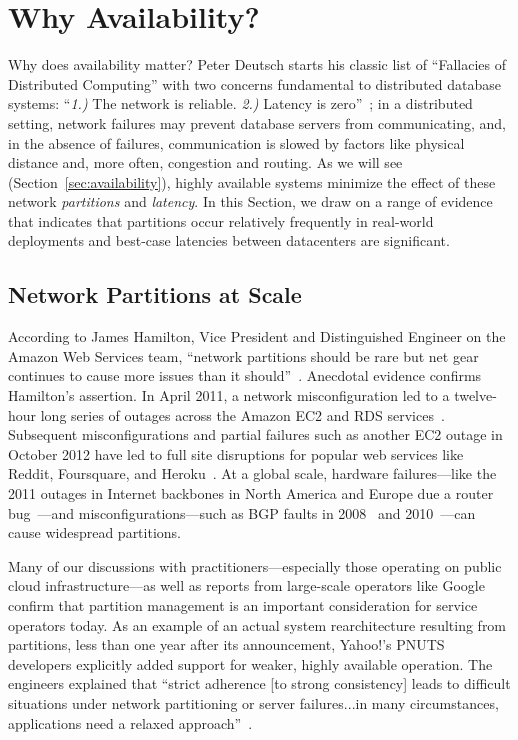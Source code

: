 
\section{Why Availability?}
\label{sec:motivation}

Why does availability matter? Peter Deutsch starts his classic list of
``Fallacies of Distributed Computing'' with two concerns fundamental
to distributed database systems: ``\textit{1.)}  The network is
reliable. \textit{2.)} Latency is zero''~\cite{fallacies-deutsch}; in
a distributed setting, network failures may prevent database servers
from communicating, and, in the absence of failures, communication is
slowed by factors like physical distance and, more often, congestion
and routing. As we will see (Section~\ref{sec:availability}), highly
available systems minimize the effect of these network
\textit{partitions} and \textit{latency}. In this Section, we draw on
a range of evidence that indicates that partitions occur relatively
frequently in real-world deployments and best-case latencies between
datacenters are significant.

\subsection{Network Partitions at Scale}

According to James Hamilton, Vice President and Distinguished Engineer
on the Amazon Web Services team, ``network partitions should be rare
but net gear continues to cause more issues than it
should''~\cite{hamilton-partitions}. Anecdotal evidence confirms
Hamilton's assertion. In April 2011, a network misconfiguration led to
a twelve-hour long series of outages across the Amazon EC2 and RDS
services~\cite{amazon-netpartition}. Subsequent misconfigurations and
partial failures such as another EC2 outage in October 2012 have led
to full site disruptions for popular web services like Reddit,
Foursquare, and Heroku~\cite{ec2-downsites}. At a global scale,
hardware failures---like the 2011 outages in Internet backbones in
North America and Europe due a router
bug~\cite{juniper-partition}---and misconfigurations---such as BGP
faults in 2008~\cite{pakistan-youtube} and
2010~\cite{research-experiment-partition}---can cause widespread
partitions.

Many of our discussions with practitioners---especially those
operating on public cloud infrastructure---as well as reports from
large-scale operators like Google~\cite{dean-keynote} confirm that
partition management is an important consideration for service operators
today. As an example of an actual system rearchitecture resulting from
partitions, less than one year after its announcement, Yahoo!'s PNUTS
developers explicitly added support for weaker, highly available
operation. The engineers explained that ``strict adherence [to strong
  consistency] leads to difficult situations under network
partitioning or server failures...in many circumstances, applications
need a relaxed approach''~\cite{pnuts-update}.

